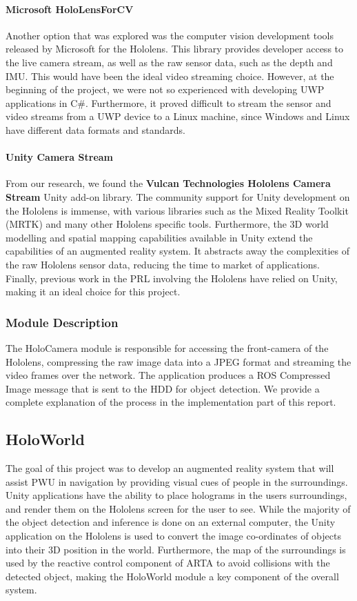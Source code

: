 \paragraph{Microsoft HoloLensForCV} Another option that was explored was the computer vision development tools released by Microsoft for the Hololens. This library provides developer access to the live camera stream, as well as the raw sensor data, such as the depth and IMU. This would have been the ideal video streaming choice. However, at the beginning of the project, we were not so experienced with developing UWP applications in C\#. Furthermore, it proved difficult to stream the sensor and video streams from a UWP device to a Linux machine, since Windows and Linux have different data formats and standards.

\paragraph{Unity Camera Stream} From our research, we found the \textbf{Vulcan Technologies Hololens Camera Stream} Unity add-on library. The community support for Unity development on the Hololens is immense, with various libraries such as the Mixed Reality Toolkit (MRTK) and many other Hololens specific tools. Furthermore, the 3D world modelling and spatial mapping capabilities available in Unity extend the capabilities of an augmented reality system. It abstracts away the complexities of the raw Hololens sensor data, reducing the time to market of applications. Finally, previous work in the PRL involving the Hololens have relied on Unity, making it an ideal choice for this project.

\subsubsection{Module Description}
The HoloCamera module is responsible for accessing the front-camera of the Hololens, compressing the raw image data into a JPEG format and streaming the video frames over the network. The application produces a ROS Compressed Image message that is sent to the HDD for object detection. We provide a complete explanation of the process in the implementation part of this report.

\subsection{HoloWorld}
The goal of this project was to develop an augmented reality system that will assist PWU in navigation by providing visual cues of people in the surroundings. Unity applications have the ability to place holograms in the users surroundings, and render them on the Hololens screen for the user to see. While the majority of the object detection and inference is done on an external computer, the Unity application on the Hololens is used to convert the image co-ordinates of objects into their 3D position in the world. Furthermore, the map of the surroundings is used by the reactive control component of ARTA to avoid collisions with the detected object, making the HoloWorld module a key component of the overall system.

